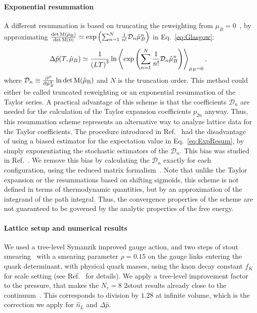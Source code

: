 \documentclass[twocolumn,showpacs,preprintnumbers,amsmath,amssymb,latexsym,prl,footinbib,floatfix,superscriptaddress]{revtex4-2}
\begin{document}
\paragraph{Exponential resummation}

A different resummation is 
based on truncating the reweighting from $\mu_B=0$~\cite{Mondal:2021jxk}, by
approximating $\frac{\det \rm{M}(\hat{\mu}_B)}{\det \rm{M}(0)} \simeq \exp \left( \sum_{n=1}^{N} \frac{1}{n!} \mathcal{D}_n \hat{\mu}_B^n \right)$
in Eq.~\eqref{eq:Glasgow}: 
\begin{equation}
    \label{eq:ExpResum}
    \Delta \hat{p}(T,\hat{\mu}_B) \simeq \frac{1}{\left( LT \right)^3} \ln \left\langle \exp \left( \sum_{n=1}^{N} \frac{1}{n!} \mathcal{D}_n \hat{\mu}_B^n  \right) \right\rangle_{\hat{\mu}_B=0} \rm{,}
\end{equation}
where $\mathcal{D}_n \equiv \frac{\partial^n}{\partial \hat{\mu}_B^2} \ln \det \rm{M(\hat{\mu}_B)}$ 
and $N$ is the truncation order.
This method could either be called truncated reweighting or an exponential 
resummation of the Taylor series. A practical 
advantage of this scheme 
is that the coefficients $\mathcal{D}_n$ are needed for the calculation of the 
Taylor expansion coefficients $p_{2n}$ anyway. Thus, this resummation scheme
represents an alternative way to analyze lattice data for the Taylor 
coefficients. The procedure introduced in 
Ref.~\cite{Mondal:2021jxk} had the disadvantage
of using a biased estimator for 
the expectation value in Eq.~\eqref{eq:ExpResum},
by simply exponentiating the stochastic estimators of 
the $\mathcal{D}_n$. 
This bias was studied in Ref.~\cite{Mitra:2022vtf}. 
We remove this bias by calculating the $\mathcal{D}_n$ exactly for each configuration, 
using the reduced matrix formalism~\cite{Hasenfratz:1991ax}. Note that unlike 
the Taylor expansion or the resummations based on shifting sigmoids, this scheme 
is not defined in terms of thermodynamic quantities, but by 
an approximation of the integrand of the path integral. Thus, the convergence
properties of the scheme are not guaranteed to be governed by the 
analytic properties of the free energy.

\paragraph{Lattice setup and numerical results}
We used a tree-level Symanzik improved gauge
action, and two steps of stout smearing~\cite{Morningstar:2003gk} with a
smearing parameter $\rho=0.15$ on the gauge links entering the quark 
determinant, with physical quark masses, using the kaon decay constant $f_K$ for scale
setting (see Ref.~\cite{Aoki:2009sc} for details). 
We apply a tree-level improvement factor to the pressure, that makes 
the $N_\tau = 8$ 2stout results already close to the continuum~\cite{Borsanyi:2010cj}.
This corresponds to division by $1.28$ at infinite volume,
which is the correction we apply for 
$\hat{n}_L$ and $\Delta \hat{p}$. 
\end{document}
